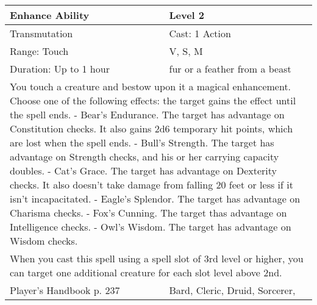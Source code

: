 \documentclass[11pt]{report}
\begin{document}
\begin{table}[H]
	\begin{tabular}{||p{6cm}|p{6cm}||}
		\hline\hline
		\bf{Enhance Ability} & Level 2\\ \hline
		Transmutation & Cast: 1 Action\\ \hline
		Range: Touch & V, S, M\\ \hline
		Duration: Up to 1 hour & fur or a feather from a beast\\ \hline
		\multicolumn{2}{||p{12cm}||}{You touch a creature and bestow upon it a magical enhancement. Choose one of the following effects: the target gains the effect until the spell ends.
- Bear’s Endurance. The target has advantage on Constitution checks. It also gains 2d6 temporary hit points, which are lost when the spell ends.
- Bull’s Strength. The target has advantage on Strength checks, and his or her carrying capacity doubles.
- Cat’s Grace. The target has advantage on Dexterity checks. It also doesn’t take damage from falling 20 feet or less if it isn’t incapacitated.
- Eagle’s Splendor. The target has advantage on Charisma checks.
- Fox’s Cunning. The target thas advantage on Intelligence checks.
- Owl’s Wisdom. The target has advantage on Wisdom checks.}\\ \hline
		\multicolumn{2}{||p{12cm}||}{When you cast this spell using a spell slot of 3rd level or higher, you can target one additional creature for each slot level above 2nd.}\\ \hline
Player's Handbook p. 237 & Bard, Cleric, Druid, Sorcerer, \\ \hline\hline
	\end{tabular}
\end{table}
\end{document}
